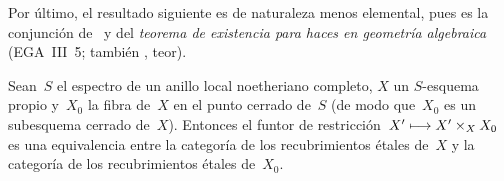 Por último, el resultado siguiente es de naturaleza menos elemental, pues
es la conjunción de~ y del \emph{teorema de existencia para
haces en geometría algebraica} (EGA~III~5; \cf también \cite{IX.1},
teor).

\begin{theoreme}
\label{IX.1.10}
Sean~$S$ el espectro de un anillo local noetheriano completo, $X$ un
$S$-esquema propio y~$X_0$ la fibra de~$X$ en el punto cerrado de~$S$ (de
modo que~$X_0$ es un subesquema cerrado de~$X$). Entonces el funtor de
restricción~$X'\longmapsto X'\times_X X_0$ es una equivalencia entre la categoría
de los recubrimientos étales de~$X$ y la categoría de los recubrimientos
étales de~$X_0$.
\end{theoreme}
